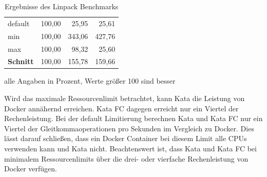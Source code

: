 \begin{table}[h]
	\small 
	\myfloatalign 
	\begin{tabularx}{\textwidth}{Xrrr} \hline
		\spacedlowsmallcaps{Limit} & \spacedlowsmallcaps{Docker} & \spacedlowsmallcaps{Kata} & \spacedlowsmallcaps{Kata FC} \\ \hline
		default & 100,00 & 25,95 & 25,61 \\
		min & 100,00 & 343,06 & 427,76 \\
		max & 100,00 & 98,32 & 25,60 \\ \hline
		\textbf{Schnitt} & 100,00 & 155,78 & 159,66 \\\hline
	\end{tabularx}
	\caption[Ergebnisse des Linpack Benchmarks]{Ergebnisse des Linpack Benchmarks}
	\footnotesize alle Angaben in Prozent, Werte größer 100 sind besser
	\label{tbl:linpackergebnis}
\end{table}

Wird das maximale Ressourcenlimit betrachtet, kann Kata die Leistung von Docker annähernd erreichen. Kata FC dagegen erreicht nur ein Viertel der Rechenleistung. Bei der default Limitierung berechnen Kata und Kata FC nur ein Viertel der Gleitkommaoperationen pro Sekunden im Vergleich zu Docker. Dies lässt darauf schließen, dass ein Docker Container bei diesem Limit alle CPUs verwenden kann und Kata nicht. Beachtenswert ist, dass Kata und Kata FC bei minimalem Ressourcenlimits über die drei- oder vierfache Rechenleistung von Docker verfügen.

